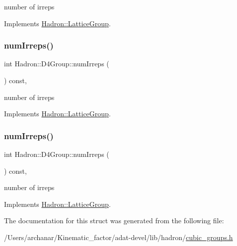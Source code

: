 number of irreps 

Implements \mbox{\hyperlink{structHadron_1_1LatticeGroup_a3edaca488144b5d2a9cf73fe653add34}{Hadron\+::\+Lattice\+Group}}.

\mbox{\label{structHadron_1_1D4Group_ae8b007038fb1aa79a7267feebf356d4c}} 
\subsubsection{\texorpdfstring{numIrreps()}{numIrreps()}\hspace{0.1cm}{\footnotesize\ttfamily [2/3]}}
{\footnotesize\ttfamily int Hadron\+::\+D4\+Group\+::num\+Irreps (\begin{DoxyParamCaption}{ }\end{DoxyParamCaption}) const\hspace{0.3cm}{\ttfamily [inline]}, {\ttfamily [virtual]}}

number of irreps 

Implements \mbox{\hyperlink{structHadron_1_1LatticeGroup_a3edaca488144b5d2a9cf73fe653add34}{Hadron\+::\+Lattice\+Group}}.

\mbox{\label{structHadron_1_1D4Group_ae8b007038fb1aa79a7267feebf356d4c}} 
\subsubsection{\texorpdfstring{numIrreps()}{numIrreps()}\hspace{0.1cm}{\footnotesize\ttfamily [3/3]}}
{\footnotesize\ttfamily int Hadron\+::\+D4\+Group\+::num\+Irreps (\begin{DoxyParamCaption}{ }\end{DoxyParamCaption}) const\hspace{0.3cm}{\ttfamily [inline]}, {\ttfamily [virtual]}}

number of irreps 

Implements \mbox{\hyperlink{structHadron_1_1LatticeGroup_a3edaca488144b5d2a9cf73fe653add34}{Hadron\+::\+Lattice\+Group}}.



The documentation for this struct was generated from the following file\+:\begin{DoxyCompactItemize}
\item 
/\+Users/archanar/\+Kinematic\+\_\+factor/adat-\/devel/lib/hadron/\mbox{\hyperlink{adat-devel_2lib_2hadron_2cubic__groups_8h}{cubic\+\_\+groups.\+h}}\end{DoxyCompactItemize}
